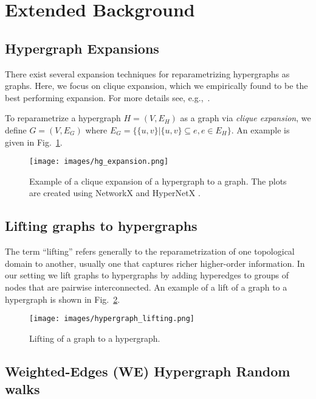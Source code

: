 \section{Extended Background}

\subsection{Hypergraph Expansions}\label{appendix-hgtog}
There exist several expansion techniques for reparametrizing hypergraphs as graphs. Here, we focus on clique expansion, which we empirically found to be the best performing expansion. For more details see, e.g.,~\citep{sun2008hypergraph}.

To reparametrize a hypergraph $H=(V,E_H)$ as a graph via \emph{clique expansion}, we define $G=(V, E_G)$ where $E_G=\{\{u,v\}| \{u,v\} \subseteq e, e \in E_H \} $. An example is given in Fig.~\ref{fig:expansion-hg-to-g}.
%
\begin{figure}[H]
  \centering
  \texttt{[image: images/hg\_expansion.png]}
  \caption{Example of a clique expansion of a hypergraph to a graph. The plots are created using NetworkX \citep{hagberg2008exploring} and HyperNetX \citep{praggastis2023hypernetx}.}
  \label{fig:expansion-hg-to-g}
\end{figure}


\subsection{Lifting graphs to hypergraphs}\label{appendix-gtohg}
The term ``lifting'' refers generally to the reparametrization of one topological domain to another, usually one that captures richer higher-order information. In our setting we lift graphs to hypergraphs by adding hyperedges to groups of nodes that are pairwise interconnected. 
An example of a lift of a graph to a hypergraph is shown in Fig.~\ref{fig:lifting-g-to-hg}.


\begin{figure}[H]
  \centering
  \texttt{[image: images/hypergraph\_lifting.png]}
  \caption{Lifting of a graph to a hypergraph.}
  \label{fig:lifting-g-to-hg}
\end{figure}



\subsection{Weighted-Edges (WE) Hypergraph Random walks}

